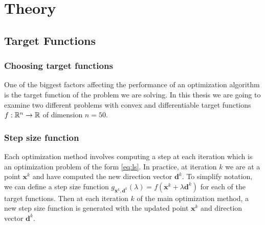 \documentclass[a4paper,english,titlepage,12pt]{article}
\newcommand{\vect}[1]{\ensuremath{\mathbf{#1}}}
\newcommand{\R}{\ensuremath\mathbb{R}}
\begin{document}
\section{Theory}


\subsection{Target Functions}


\subsubsection{Choosing target functions}


One of the biggest factors affecting the performance of an optimization algorithm is the target function of the problem we are solving. 
In this thesis we are going to examine two different problems with convex and differentiable target functions $f : \R^n \rightarrow \R$ of dimension $n = 50$. 


\subsubsection{Step size function}

Each optimization method involves computing a step at each iteration which is an optimization problem of the form \eqref{eq:ls}. In practice, at iteration $k$ we are at a point $\vect{x}^k$ and have computed the new direction vector $\vect{d}^k$. To simplify notation, we can define a step size function $g_{\vect{x}^k, \vect{d}^k}(\lambda) = f(\vect{x}^k + \lambda \vect{d}^k)$ for each of the target functions. Then at each iteration $k$ of the main optimization method, a new step size function is generated with the updated point $\vect{x}^k$ and direction vector $\vect{d}^k$.
\end{document}
